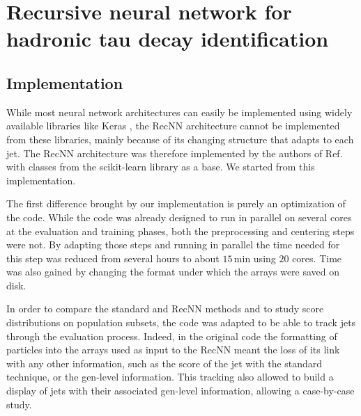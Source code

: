 \section{Recursive neural network for hadronic tau decay identification}





\subsection{Implementation}

While most neural network architectures can easily be implemented using widely available libraries like Keras \cite{chollet2015keras}, the RecNN architecture cannot be implemented from these libraries, mainly because of its changing structure that adapts to each jet. The RecNN architecture was therefore implemented by the authors of Ref. \cite{Louppe:2017ipp} with classes from the scikit-learn library \cite{scikit-learn} as a base. We started from this implementation. 

The first difference brought by our implementation is purely an optimization of the code. While the code was already designed to run in parallel on several cores at the evaluation and training phases, both the preprocessing and centering steps were not. By adapting those steps and running in parallel the time needed for this step was reduced from several hours to about $15\,\mathrm{min}$ using $20$ cores. Time was also gained by changing the format under which the arrays were saved on disk.

In order to compare the standard and RecNN methods and to study score distributions on population subsets, the code was adapted to be able to track jets through the evaluation process. Indeed, in the original code the formatting of particles into the arrays used as input to the RecNN meant the loss of its link with any other information, such as the score of the jet with the standard technique, or the gen-level information. This tracking also allowed to build a display of jets with their associated gen-level information, allowing a case-by-case study.


